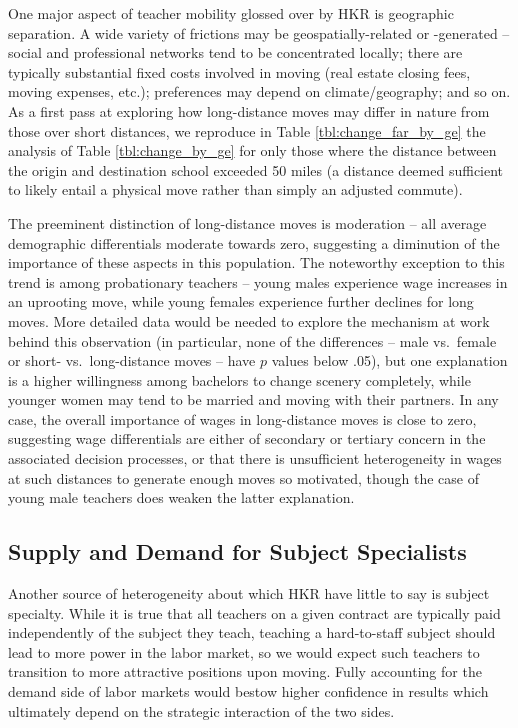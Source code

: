 One major aspect of teacher mobility glossed over by HKR is geographic
separation. A wide variety of frictions may be geospatially-related or
-generated -- social and professional networks tend to be concentrated
locally; there are typically substantial fixed costs involved in moving
(real estate closing fees, moving expenses, etc.); preferences may
depend on climate/geography; and so on. As a first pass at exploring how
long-distance moves may differ in nature from those over short
distances, we reproduce in Table \ref{tbl:change_far_by_ge} the analysis
of Table \ref{tbl:change_by_ge} for only those where the distance
between the origin and destination school exceeded 50 miles (a distance
deemed sufficient to likely entail a physical move rather than simply an
adjusted commute).

The preeminent distinction of long-distance moves is moderation -- all
average demographic differentials moderate towards zero, suggesting a
diminution of the importance of these aspects in this population. The
noteworthy exception to this trend is among probationary teachers --
young males experience wage increases in an uprooting move, while young
females experience further declines for long moves. More detailed data
would be needed to explore the mechanism at work behind this observation
(in particular, none of the differences -- male vs.~female or short-
vs.~long-distance moves -- have \(p\) values below .05), but one
explanation is a higher willingness among bachelors to change scenery
completely, while younger women may tend to be married and moving with
their partners. In any case, the overall importance of wages in
long-distance moves is close to zero, suggesting wage differentials are
either of secondary or tertiary concern in the associated decision
processes, or that there is unsufficient heterogeneity in wages at such
distances to generate enough moves so motivated, though the case of
young male teachers does weaken the latter explanation.

\subsection{Supply and Demand for Subject
Specialists}\label{supply-and-demand-for-subject-specialists}

Another source of heterogeneity about which HKR have little to say is
subject specialty. While it is true that all teachers on a given
contract are typically paid independently of the subject they teach,
teaching a hard-to-staff subject should lead to more power in the labor
market, so we would expect such teachers to transition to more
attractive positions upon moving. Fully accounting for the demand side
of labor markets would bestow higher confidence in results which
ultimately depend on the strategic interaction of the two sides.

